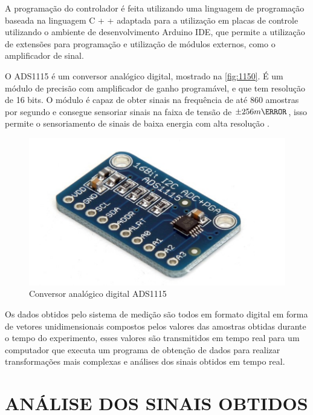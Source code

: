 A programação do controlador é feita utilizando uma linguagem de programação baseada na linguagem C + + adaptada para a utilização em placas de controle utilizando o ambiente
de desenvolvimento Arduino IDE, que permite a utilização de extensões para programação e utilização de módulos externos, como o amplificador de sinal.

O ADS1115 é um conversor analógico digital, mostrado na \autoref{fig:1150}.
É um módulo de precisão com amplificador de ganho programável, e que tem resolução de 16 bits.
O módulo é capaz de obter sinais na frequência de até 860 amostras por segundo e consegue sensoriar sinais na faixa de tensão de ${\pm 256}{m\V}$,
isso permite o sensoriamento de sinais de baixa energia com alta resolução \autocite{DocsADS115}.

\begin{figure}[htb]
	\caption{\label{fig:1150} Conversor analógico digital ADS1115}
	\begin{center}
		\includegraphics[width=\textwidth]{pictures/1150.png}
	\end{center}
\end{figure}

Os dados obtidos pelo sistema de medição são todos em formato digital em forma de vetores unidimensionais compostos pelos valores das amostras obtidas durante o tempo do
experimento, esses valores são transmitidos em tempo real para um computador que executa um programa de obtenção de dados para realizar transformações mais complexas e
análises dos sinais obtidos em tempo real.

\section{ANÁLISE DOS SINAIS OBTIDOS}

